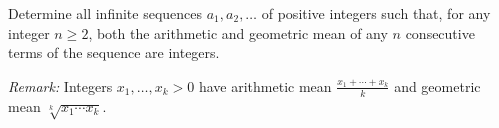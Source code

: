 Determine all infinite sequences $a_1, a_2, \dots$ of positive integers such that, for any integer $n\geq 2$,
both the arithmetic and geometric mean of any $n$ consecutive terms of the sequence are integers.
    
\emph{Remark:} Integers $x_1,\dots, x_k > 0$ have arithmetic mean $\frac{x_1+\cdots+x_k}{k}$ and
geometric mean $\sqrt[k]{x_1\cdots x_k}$.
